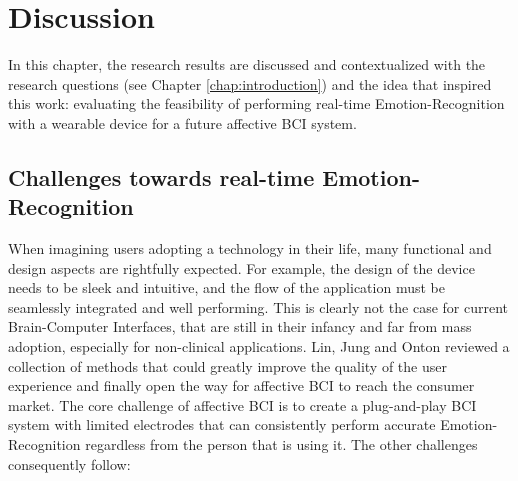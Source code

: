 \chapter{Discussion}
\label{chap:discussion}
In this chapter, the research results are discussed and contextualized with the research questions (see Chapter \ref{chap:introduction}) and the idea that inspired this work: evaluating the feasibility of performing real-time Emotion-Recognition with a wearable device for a future affective \ac{BCI} system. 

\section{Challenges towards real-time Emotion-Recognition}
\label{sec:challenges}
When imagining users adopting a technology in their life, many functional and design aspects are rightfully expected. For example, the design of the device needs to be sleek and intuitive, and the flow of the application must be seamlessly integrated and well performing. This is clearly not the case for current Brain-Computer Interfaces, that are still in their infancy and far from mass adoption, especially for non-clinical applications. Lin, Jung and Onton \cite{lin_toward_2015} reviewed a collection of methods that could greatly improve the quality of the user experience and finally open the way for affective \ac{BCI} to reach the consumer market. The core challenge of affective \ac{BCI}  is to create a plug-and-play \ac{BCI}  system with limited electrodes that can consistently perform accurate Emotion-Recognition regardless from the person that is using it. The other challenges consequently follow:
